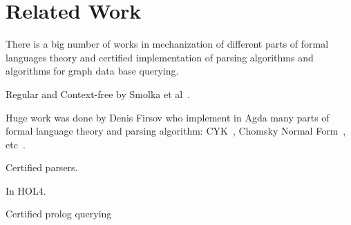 \section{Related Work}

There is a big number of works in mechanization of different parts of formal languages theory and certified implementation of parsing algorithms and algorithms for graph data base querying.

Regular and Context-free by Smolka et al~\cite{smolka2017regular, smolka2013regular}. 

Huge work was done by Denis Firsov who implement in Agda many parts of formal language theory and parsing algorithm: CYK~\cite{!!!}, Chomsky Normal Form~\cite{!!!}, etc~\cite{firsov2016cfl}.

Certified parsers.

In HOL4.

Certified prolog querying~\cite{certifiedPrologGraphQuerying}





